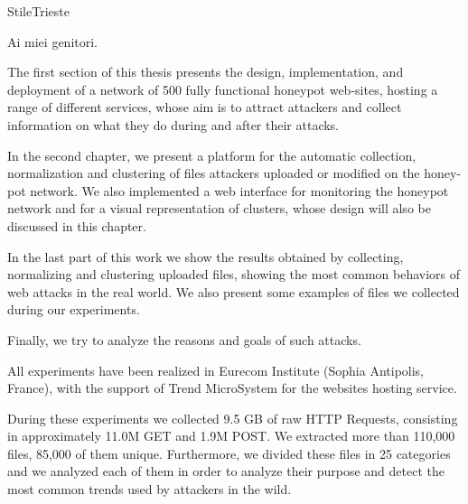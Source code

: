 \documentclass[pdfa%
,cucitura%
]{toptesi}
\begin{document}

\expandafter\ifx\csname StileTrieste\endcsname\relax
    \frontespizio
\else
    \paginavuota
    \begin{dedica}
        Ai miei genitori.
    \end{dedica}
    \tomo
\fi


\sommario

The first section of this thesis presents the design, implementation, and deployment of a network of 500 fully functional honeypot web-sites, hosting a range of different services, whose aim is to attract attackers and collect information on what they do during and after their attacks.

In the second chapter, we present a platform for the automatic collection, normalization and clustering of files attackers uploaded or modified on the honey-pot network. We also implemented a web interface for monitoring the honeypot network and for a visual representation of clusters, whose design will also be discussed in this chapter.

In the last part of this work we show the results obtained by collecting, normalizing and clustering uploaded files, showing the most common behaviors of web attacks in the real world. We also present some examples of files we collected during our experiments.

Finally, we try to analyze the reasons and goals of such attacks.

All experiments have been realized in Eurecom Institute (Sophia Antipolis, France), with the support of Trend MicroSystem for the websites hosting service.

During these experiments we collected 9.5 GB of raw HTTP Requests, consisting in approximately 11.0M GET and 1.9M POST. We extracted more than 110,000 files, 85,000 of them unique. Furthermore, we divided these files in 25 categories and we analyzed each of them in order to analyze their purpose and detect the most common trends used by attackers in the wild.


\end{document}
